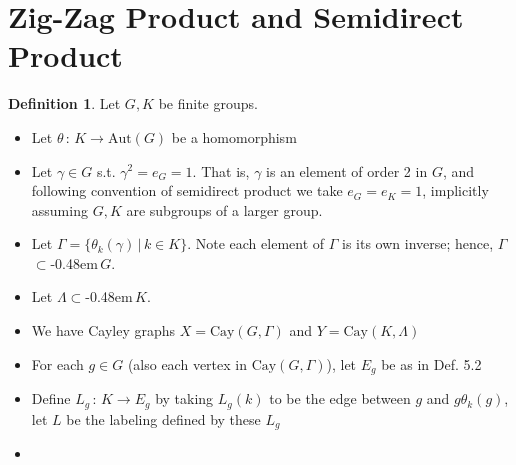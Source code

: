 \documentclass{book}
\newcommand{\syin}{$\subset$\kern-0.48em\raisebox{.20ex}{\tiny S}$\,$}
\newcommand{\Cay}[1]{\textrm{Cay}( #1 )}
\newcommand{\Aut}[1]{\textrm{Aut}( #1 )}
\theoremstyle{definition}
\newtheorem{definition}[lemma]{Definition}
\theoremstyle{remarkstyle}
\begin{document}
\clearpage
\section{Zig-Zag Product and Semidirect Product}
\begin{definition}
Let $G,K$ be finite groups.
    \begin{itemize}
        \item Let $\theta\,:\, K\rightarrow \Aut{G}$ be a homomorphism
        \item Let $\gamma\in G$ s.t. $\gamma^2 = e_G = 1$. That is, $\gamma$ is an element of order 2 in $G$, and following convention of semidirect product we take $e_G=e_K=1$, implicitly assuming $G,K$ are subgroups of a larger group.
        \item Let $\Gamma=\{\theta_k(\gamma)\,\lvert\,k\in K\}$. Note each element of $\Gamma$ is its own inverse; hence, $\Gamma$\syin$G$.
        \item Let $\Lambda$\syin$K$.
        \item We have Cayley graphs $X=\Cay{G,\Gamma}$ and $Y=\Cay{K,\Lambda}$
        \item For each $g\in G$ (also each vertex in $\Cay{G,\Gamma}$), let $E_g$ be as in Def. 5.2
        \item Define $L_g\,:\,K\rightarrow E_g$ by taking $L_g(k)$ to be the edge between $g$ and $g\theta_k(g)$, let $L$ be the labeling defined by these $L_g$
        \item[] 
    \end{itemize}
\end{definition}
\end{document}
